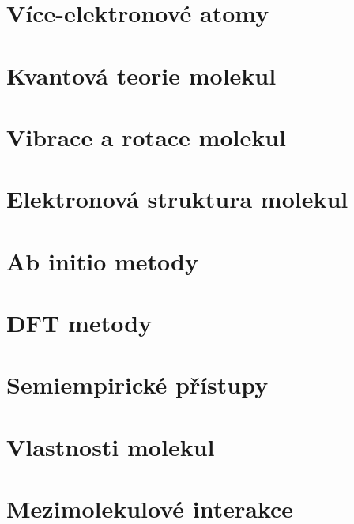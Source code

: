 \documentclass[a4paper,12pt]{article}
\numberwithin{equation}{section} %
\begin{document}
\clearpage
\section{Více-elektronové atomy}
\label{kap:viceelektron}


\clearpage
\section{Kvantová teorie molekul}
\label{kap:molekuly}


\clearpage
\section{Vibrace a rotace molekul}
\label{kap:vibrot}


\clearpage
\section{Elektronová struktura molekul}
\label{kap:elstruktmol}


\clearpage
\section{Ab initio metody}
\label{kap:abinitio}


\clearpage
\section{DFT metody}
\label{kap:dft}


\clearpage
\section{Semiempirické přístupy}
\label{kap:semiemp}


\clearpage
\section{Vlastnosti molekul}
\label{kap:vlastnosti}


\clearpage
\section{Mezimolekulové interakce}
\label{kap:mezimolsily}

\end{document}
